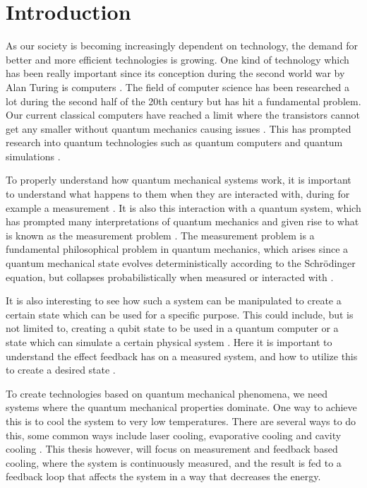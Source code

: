 \section{Introduction}
As our society is becoming increasingly dependent on technology, the demand for better and more efficient technologies is growing. One kind of technology which has been really important since its conception during the second world war by Alan Turing is computers \cite{Nielsen:2010}. The field of computer science has been researched a lot during the second half of the 20th century but has hit a fundamental problem. Our current classical computers have reached a limit where the transistors cannot get any smaller without quantum mechanics causing issues \cite{Nielsen:2010}. This has prompted research into quantum technologies such as quantum computers and quantum simulations \cite{Nielsen:2010}. 

To properly understand how quantum mechanical systems work, it is important to understand what happens to them when they are interacted with, during for example a measurement \cite{Jordan:2024}. It is also this interaction with a quantum system, which has prompted many interpretations of quantum mechanics and given rise to what is known as the measurement problem \cite{Jordan:2024}. The measurement problem is a fundamental philosophical problem in quantum mechanics, which arises since a quantum mechanical state evolves deterministically according to the Schrödinger equation, but collapses probabilistically when measured or interacted with \cite{Jordan:2024}.

It is also interesting to see how such a system can be manipulated to create a certain state which can be used for a specific purpose. This could include, but is not limited to, creating a qubit state to be used in a quantum computer or a state which can simulate a certain physical system \cite{Nielsen:2010}. Here it is important to understand the effect feedback has on a measured system, and how to utilize this to create a desired state \cite{Annby-Andersson:2024}.

To create technologies based on quantum mechanical phenomena, we need systems where the quantum mechanical properties dominate. One way to achieve this is to cool the system to very low temperatures. There are several ways to do this, some common ways include laser cooling, evaporative cooling and cavity cooling \cite{De-Sousa:2025}. This thesis however, will focus on measurement and feedback based cooling, where the system is continuously measured, and the result is fed to a feedback loop that affects the system in a way that decreases the energy. 

